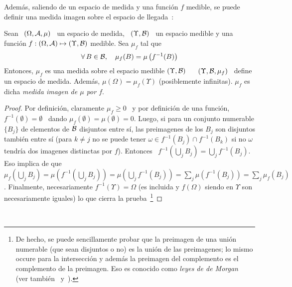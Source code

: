 Adem\'as, saliendo de un espacio de medida y una funci\'on $f$ medible, se puede
definir una medida imagen  sobre el espacio de llegada~\cite{AthLah06, Bog07:v1,
  Coh13}:
%
\begin{teorema}\label{Th:MP:MedidaImagen}
  Sean  \ $(\Omega,\mathcal{A},\mu)$  \  un espacio  de  medida, \  $(\Upsilon,\mathcal{B})$ \  un
  espacio  medible  y  una  funci\'on  $f:  (\Omega,\mathcal{A})  \mapsto  (\Upsilon,\mathcal{B})$
  medible. Sea $\mu_f$ tal que
  \[
  \forall \,  B \in  \mathcal{B}, \quad  \mu_f(B) = \mu\left( f^{-1}(B) \right)
  \]
  Entonces, $\mu_f$ es una medida sobre el espacio medible $(\Upsilon,\mathcal{B})$ \ \ie
  \ $(\Upsilon,\mathcal{B},\mu_f)$ \ define un espacio de medida.  Adem\'as, $\mu(\Omega)
  =  \mu_f(\Upsilon)$ (posiblemente  infinitas).  $\mu_f$ es  dicha {\it  medida
    imagen de $\mu$ por $f$}.
\end{teorema}
%
\begin{proof}
  Por  definici\'on,  claramente $\mu_f  \ge  0$ \  y  por  definici\'on de  una
  funci\'on,  $f^{-1}(\emptyset)  =   \emptyset$  \  dando  $\mu_f(\emptyset)  =
  \mu(\emptyset) =  0$.  Luego,  si para  un conjunto numerable  $\{ B_j  \}$ de
  elementos  de $\mathcal{B}$  disjuntos entre  s\'i, las  preimagenes de  los  $B_j$ son
  disjuntos tambi\'en entre  s\'i (para $k \ne j$ no se  puede tener $\omega \in
  f^{-1}(B_j) \cap f^{-1}(B_k)$ si no $\omega$ tendr\'ia dos imagenes distinctas
  por  $f$).   Entonces  \  $f^{-1}\left(  \bigcup_j  B_j  \right)  =  \bigcup_j
  f^{-1}(B_j)$.   Eso implica  de que  \  $\mu_f\left( \bigcup_j  B_j \right)  =
  \mu\left(  f^{-1}\left( \bigcup_j  B_j \right)  \right) =  \mu\left( \bigcup_j
    f^{-1}(B_j)  \right)  =  \sum_j   \mu\left(  f^{-1}(B_j)  \right)  =  \sum_j
  \mu_f(B_j)$.   Finalmente,  necesariamente  $f^{-1}(\Upsilon)  =  \Omega$  (es
  incluida y $f(\Omega)$ siendo en $\Upsilon$ son necesariamente iguales) lo que
  cierra  la prueba~\footnote{De  hecho, se  puede sencillamente  probar  que la
    preimagen de una  uni\'on numerable (que sean disjuntos o  no) es la uni\'on
    de las  preimagenes; lo  mismo occure para  la intersecci\'on y  adem\'as la
    preimagen  del  complemento es  el  complemento  de  la preimagen.   Eso  es
    conocido como {\it leyes de de Morgan}~\cite{AthLah06, Coh13, HogMck13} (ver
    tambi\'en~\cite[Cap.~1]{KolFom57}
    y~\cite[Caps.~5~\&~6]{KolFom61}).\label{foot:MP:Jacobiana}}
\end{proof}

\

